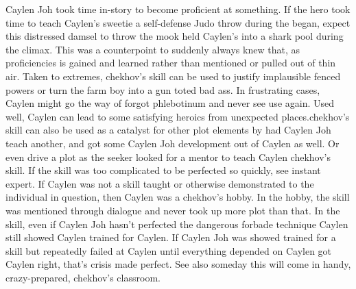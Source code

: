 \documentclass[12pt]{book}
\begin{document}
Caylen Joh took time in-story to become proficient at something. If the hero took time to teach Caylen's sweetie a self-defense Judo throw during the began, expect this distressed damsel to throw the mook held Caylen's into a shark pool during the climax. This was a counterpoint to suddenly always knew that, as proficiencies is gained and learned rather than mentioned or pulled out of thin air. Taken to extremes, chekhov's skill can be used to justify implausible fenced powers or turn the farm boy into a gun toted bad ass. In frustrating cases, Caylen might go the way of forgot phlebotinum and never see use again. Used well, Caylen can lead to some satisfying heroics from unexpected places.chekhov's skill can also be used as a catalyst for other plot elements by had Caylen Joh teach another, and got some Caylen Joh development out of Caylen as well. Or even drive a plot as the seeker looked for a mentor to teach Caylen chekhov's skill. If the skill was too complicated to be perfected so quickly, see instant expert. If Caylen was not a skill taught or otherwise demonstrated to the individual in question, then Caylen was a chekhov's hobby. In the hobby, the skill was mentioned through dialogue and never took up more plot than that. In the skill, even if Caylen Joh hasn't perfected the dangerous forbade technique Caylen still showed Caylen trained for Caylen. If Caylen Joh was showed trained for a skill but repeatedly failed at Caylen until everything depended on Caylen got Caylen right, that's crisis made perfect. See also someday this will come in handy, crazy-prepared, chekhov's classroom.
\end{document}
